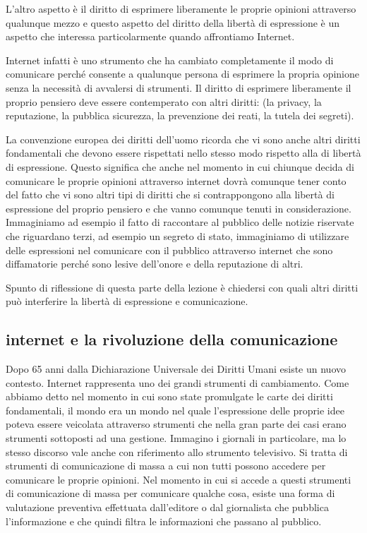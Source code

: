 L'altro aspetto è il diritto di esprimere liberamente le proprie opinioni attraverso qualunque mezzo e questo aspetto del diritto della libertà di espressione è un aspetto che interessa particolarmente quando affrontiamo Internet.

Internet infatti è uno strumento che ha cambiato completamente il modo di comunicare perché consente a qualunque persona di esprimere la propria opinione senza la necessità di avvalersi di strumenti. 
Il diritto di esprimere liberamente il proprio pensiero deve essere contemperato con altri diritti: (la privacy, la reputazione, la pubblica sicurezza, la prevenzione dei reati, la tutela dei segreti).

La convenzione europea dei diritti dell'uomo ricorda che vi sono anche altri diritti fondamentali che devono essere rispettati nello stesso modo rispetto alla di libertà di espressione. Questo significa che anche nel momento in cui chiunque decida di comunicare le proprie opinioni attraverso internet dovrà comunque tener conto del fatto che vi sono altri tipi di diritti che si contrappongono alla libertà di espressione del proprio pensiero e che vanno comunque tenuti in considerazione. Immaginiamo ad esempio il fatto di raccontare al pubblico delle notizie riservate che riguardano terzi, ad esempio un segreto di stato, immaginiamo di utilizzare delle espressioni nel comunicare con il pubblico attraverso internet che sono diffamatorie perché sono lesive dell'onore e della reputazione di altri.

Spunto di riflessione di questa parte della lezione è chiedersi con quali altri diritti può interferire la libertà di espressione e comunicazione.

\subsection{internet e la rivoluzione della comunicazione}

Dopo 65 anni dalla Dichiarazione Universale dei Diritti Umani esiste un nuovo contesto. Internet rappresenta uno dei grandi strumenti di cambiamento. Come abbiamo detto nel momento in cui sono state promulgate le carte dei diritti fondamentali, il mondo era un mondo nel quale l'espressione delle proprie idee poteva essere veicolata attraverso strumenti che nella gran parte dei casi erano strumenti sottoposti ad una gestione. Immagino i giornali in particolare, ma lo stesso discorso vale anche con riferimento allo strumento televisivo. Si tratta di strumenti di comunicazione di massa a cui non tutti possono accedere per comunicare le proprie opinioni. Nel momento in cui si accede a questi strumenti di comunicazione di massa per comunicare qualche cosa, esiste una forma di valutazione preventiva effettuata dall'editore o dal giornalista che pubblica l'informazione e che quindi filtra le informazioni che passano al pubblico.


